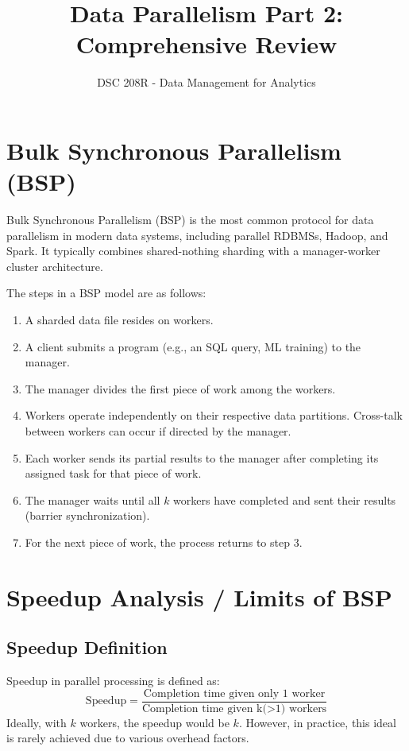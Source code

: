 \documentclass{article}
\title{Data Parallelism Part 2: Comprehensive Review}
\author{DSC 208R - Data Management for Analytics}
\date{}
\begin{document}
\maketitle

\section*{Bulk Synchronous Parallelism (BSP)}
Bulk Synchronous Parallelism (BSP) is the most common protocol for data parallelism in modern data systems, including parallel RDBMSs, Hadoop, and Spark. It typically combines shared-nothing sharding with a manager-worker cluster architecture.

The steps in a BSP model are as follows:
\begin{enumerate}
    \item A sharded data file resides on workers.
    \item A client submits a program (e.g., an SQL query, ML training) to the manager.
    \item The manager divides the first piece of work among the workers.
    \item Workers operate independently on their respective data partitions. Cross-talk between workers can occur if directed by the manager.
    \item Each worker sends its partial results to the manager after completing its assigned task for that piece of work.
    \item The manager waits until all $k$ workers have completed and sent their results (barrier synchronization).
    \item For the next piece of work, the process returns to step 3.
\end{enumerate}

\section*{Speedup Analysis / Limits of BSP}
\subsection*{Speedup Definition}
Speedup in parallel processing is defined as:
\[
\text{Speedup} = \frac{\text{Completion time given only 1 worker}}{\text{Completion time given k(>1) workers}}
\]
Ideally, with $k$ workers, the speedup would be $k$. However, in practice, this ideal is rarely achieved due to various overhead factors.
\end{document}
